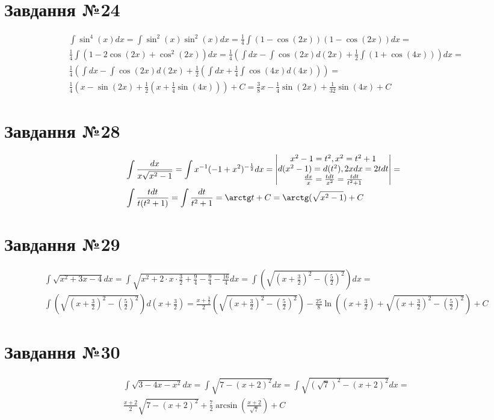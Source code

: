 \documentclass{report}
\begin{document}
\section{Завдання №24}
\begin{equation}\begin{split}
	& \int \sin^4(x)dx = \int \sin^2(x)\sin^2(x)dx = \frac{1}{4}\int(1 - \cos(2x))(1 - \cos(2x))dx =\\
	& \frac{1}{4}\int(1 - 2\cos(2x) + \cos^2(2x))dx = \frac{1}{4}(\int dx - \int\cos(2x)d(2x) + \frac{1}{2}\int(1 + \cos(4x)))dx =\\
	& \frac{1}{4}(\int dx - \int\cos(2x)d(2x) + \frac{1}{2}(\int dx + \frac{1}{4}\int\cos(4x)d(4x))) =\\
	& \frac{1}{4}(x - \sin(2x) + \frac{1}{2}(x + \frac{1}{4}\sin(4x))) + C = \frac{3}{8}x - \frac{1}{4}\sin(2x) + \frac{1}{32}\sin(4x) + C
\end{split}\end{equation}

\section{Завдання №28}
\begin{equation}\label{eq28}\begin{split}
	& \int \frac{dx}{x\sqrt{x^2 - 1}} = \int x^{-1}(-1 + x^2)^{-\frac{1}{2}}dx = \begin{vmatrix}x^2 - 1= t^2, x^2 = t^2 + 1\\d(x^2 - 1) = d(t^2), 2xdx = 2tdt\\\frac{dx}{x} = \frac{tdt}{x^2} = \frac{tdt}{t^2 + 1}\end{vmatrix} =\\
	& \int\frac{tdt}{t(t^2 + 1)} = \int\frac{dt}{t^2 + 1} = \arctg t + C = \arctg(\sqrt{x^2 - 1}) + C
\end{split}
\end{equation}

\section{Завдання №29}
\begin{equation}\begin{split}
	& \int\sqrt{x^2 + 3x - 4}dx = \int\sqrt{x^2 + 2\cdot x\cdot\frac{3}{2} + \frac{9}{4} - \frac{9}{4} - \frac{16}{4}}dx = \int(\sqrt{(x + \frac{3}{2})^2 - (\frac{5}{2})^2}) dx =\\
	& \int(\sqrt{(x + \frac{3}{2})^2 - (\frac{5}{2})^2}) d(x+\frac{3}{2}) = \frac{x + \frac{3}{2}}{2}(\sqrt{(x + \frac{3}{2})^2 - (\frac{5}{2})^2}) - \frac{25}{8}\ln\left((x + \frac{3}{2}) + \sqrt{(x + \frac{3}{2})^2 - (\frac{5}{2})^2}\right) + C
\end{split}\end{equation}

\section{Завдання №30}
\begin{equation}\begin{split}
	& \int\sqrt{3 - 4x - x^2}dx = \int\sqrt{7 - (x + 2)^2}dx = \int\sqrt{(\sqrt{7})^2 - (x + 2)^2}dx =\\
	& \frac{x + 2}{2}\sqrt{7 - (x + 2)^2} + \frac{7}{2}\arcsin\left(\frac{x + 2}{\sqrt{7}}\right) + C
\end{split}\end{equation}
\end{document}
